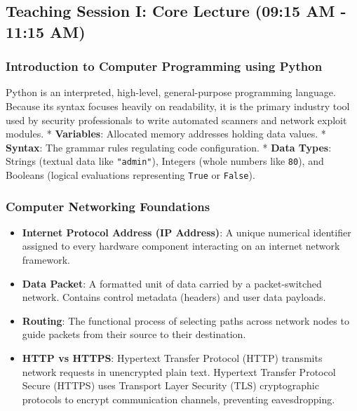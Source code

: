 \documentclass[12pt,openany]{book}
\begin{document}
\medskip

\subsection*{Teaching Session I: Core Lecture (09:15 AM - 11:15 AM)}


\subsubsection*{Introduction to Computer Programming using Python}


Python is an interpreted, high-level, general-purpose programming language. Because its syntax focuses heavily on readability, it is the primary industry tool used by security professionals to write automated scanners and network exploit modules.
* \textbf{Variables}: Allocated memory addresses holding data values.
* \textbf{Syntax}: The grammar rules regulating code configuration.
* \textbf{Data Types}: Strings (textual data like \texttt{"admin"}), Integers (whole numbers like \texttt{80}), and Booleans (logical evaluations representing \texttt{True} or \texttt{False}).


\subsubsection*{Computer Networking Foundations}


\begin{itemize}

  \item \textbf{Internet Protocol Address (IP Address)}: A unique numerical identifier assigned to every hardware component interacting on an internet network framework.

  \item \textbf{Data Packet}: A formatted unit of data carried by a packet-switched network. Contains control metadata (headers) and user data payloads.

  \item \textbf{Routing}: The functional process of selecting paths across network nodes to guide packets from their source to their destination.

  \item \textbf{HTTP vs HTTPS}: Hypertext Transfer Protocol (HTTP) transmits network requests in unencrypted plain text. Hypertext Transfer Protocol Secure (HTTPS) uses Transport Layer Security (TLS) cryptographic protocols to encrypt communication channels, preventing eavesdropping.

\end{itemize}
\end{document}
